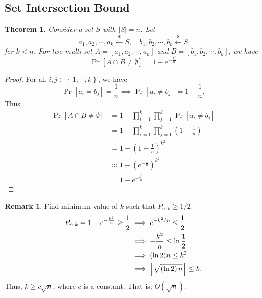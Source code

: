 \documentclass[12pt,openany]{book}
\DeclarePairedDelimiter{\ceil}{\lceil}{\rceil}
\DeclarePairedDelimiter{\floor}{\lfloor}{\rfloor}
\newtheorem{theorem}{Theorem}[chapter]
\theoremstyle{definition}
\newtheorem{remark}{Remark}[chapter]
\newcommand{\set}[1]{\left\{#1\right\}}
\newcommand{\of}[1]{\left( #1 \right)}
\newcommand{\abs}[1]{\left\lvert #1 \right\rvert}
\newcommand{\dollar}{\$}
\newcommand{\uniform}{\xleftarrow{\dollar}}
\begin{document}
	\iffalse
	\begin{remark}
		Find the upper bound of $P_{n,k}$. \begin{align*}
		P_{n,k}
		&=\Pr\left[(a_1=a_2)\lor\cdots\lor(a_1=a_k)\lor(a_2=a_3)\lor\cdots\lor(a_{k-1}=a_k)\right]\\
		&\leq\sum_{1\leq i< j\leq k}\Pr\left[a_i=a_j\right]\\
		&=\binom{k}{2}\frac{1}{n}\\
		&\leq\frac{k^2}{2n}.
		\end{align*} Thus, the upper bound of $P_{n,k}$ is less than 1/2 when $k=\floor*{\sqrt{n}}$.
	\end{remark}
	\fi
	
	\subsection{Set Intersection Bound}
	
	\begin{tcolorbox}[colback=white,colframe=thmcolor,arc=5pt,title={\color{white}\bf Set Intersection Bound}]
		\begin{theorem}
			Consider a set $S$ with $\abs{S}=n$. Let \[
			a_1,a_2,\cdots, a_k\uniform S,\quad b_1,b_2,\cdots, b_k\uniform S
			\] for $k<n$. For two multi-set $A=[a_1,a_2,\cdots,a_k]$ and $B=[b_1,b_2,\cdots, b_k]$, we have \[
			\Pr[A\cap B\neq\emptyset]=1-e^{-\frac{k^2}{n}}
			\]
		\end{theorem}
	\end{tcolorbox}
	\begin{proof}
		For all $i,j\in\set{1,\cdots, k}$, we have \[
		\Pr[a_i=b_j]=\frac{1}{n}\implies\Pr[a_i\neq b_j]=1-\frac{1}{n}.
		\] Thus \begin{align*}
		\Pr[A\cap B\neq\emptyset]&=1-\prod_{i=1}^k\prod_{j=1}^k\Pr[a_i\neq b_j]\\
		&=1-\prod_{i=1}^k\prod_{j=1}^k\of{1-\frac{1}{n}}\\
		&=1-\of{1-\frac{1}{n}}^{k^2}\\
		&\approx 1-\of{e^{-\frac{1}{n}}}^{k^2}\\
		&=1-e^{-\frac{k^2}{n}}.
		\end{align*}
	\end{proof}
	
	\begin{remark}
		Find minimum value of $k$ such that $P_{n,k}\geq 1/2$. \begin{align*}
		P_{n,k}=1-e^{-\frac{k^2}{n}}\geq\frac{1}{2}&\implies e^{-k^2/n}\leq\frac{1}{2}\\
		&\implies-\frac{k^2}{n}\leq\ln\frac{1}{2}\\
		&\implies (\ln2)n\leq k^2\\
		&\implies \ceil*{\sqrt{\of{\ln 2}n}}\leq k.
		\end{align*} 
		Thus, $k\geq c\sqrt{n}$, where $c$ is a constant. That is, $O(\sqrt{n})$.
	\end{remark}
	
\end{document}
